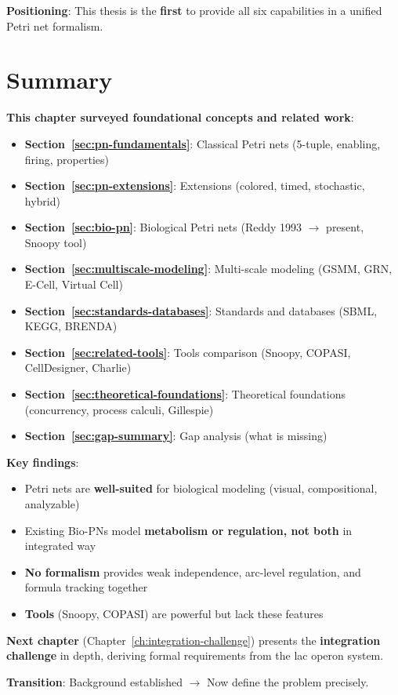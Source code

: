 \textbf{Positioning}: This thesis is the \textbf{first} to provide all six capabilities in a unified Petri net formalism.

\section{Summary}
\label{sec:ch2-summary}

\textbf{This chapter surveyed foundational concepts and related work}:

\begin{itemize}
    \item \textbf{Section~\ref{sec:pn-fundamentals}}: Classical Petri nets (5-tuple, enabling, firing, properties)
    \item \textbf{Section~\ref{sec:pn-extensions}}: Extensions (colored, timed, stochastic, hybrid)
    \item \textbf{Section~\ref{sec:bio-pn}}: Biological Petri nets (Reddy 1993 $\to$ present, Snoopy tool)
    \item \textbf{Section~\ref{sec:multiscale-modeling}}: Multi-scale modeling (GSMM, GRN, E-Cell, Virtual Cell)
    \item \textbf{Section~\ref{sec:standards-databases}}: Standards and databases (SBML, KEGG, BRENDA)
    \item \textbf{Section~\ref{sec:related-tools}}: Tools comparison (Snoopy, COPASI, CellDesigner, Charlie)
    \item \textbf{Section~\ref{sec:theoretical-foundations}}: Theoretical foundations (concurrency, process calculi, Gillespie)
    \item \textbf{Section~\ref{sec:gap-summary}}: Gap analysis (what is missing)
\end{itemize}

\textbf{Key findings}:

\begin{itemize}
    \item Petri nets are \textbf{well-suited} for biological modeling (visual, compositional, analyzable)
    \item Existing Bio-PNs model \textbf{metabolism or regulation, not both} in integrated way
    \item \textbf{No formalism} provides weak independence, arc-level regulation, and formula tracking together
    \item \textbf{Tools} (Snoopy, COPASI) are powerful but lack these features
\end{itemize}

\textbf{Next chapter} (Chapter~\ref{ch:integration-challenge}) presents the \textbf{integration challenge} in depth, deriving formal requirements from the lac operon system.

\textbf{Transition}: Background established $\to$ Now define the problem precisely.
